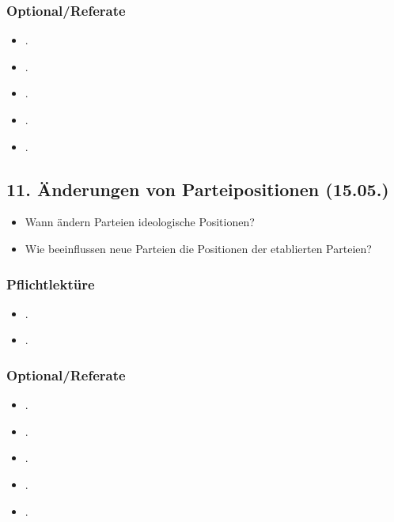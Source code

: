 \documentclass[abstract=on,parskip=full,headings=standardclasses,fontsize=11pt,paper=a4]{scrartcl}
\begin{document}
\subsubsection*{Optional/Referate}
\begin{itemize}
\item {}.
\item {}.
\item {}.
\item {}.
\item {}.
\end{itemize}


\subsection{11. Änderungen von Parteipositionen (15.05.)}

\begin{itemize}
\renewcommand\labelitemi{--}
\item Wann ändern Parteien ideologische Positionen?
\item Wie beeinflussen neue Parteien die Positionen der etablierten Parteien?
\end{itemize}


\subsubsection*{Pflichtlektüre}
\begin{itemize}
\item {}.
\item {}.
\end{itemize}



\subsubsection*{Optional/Referate}
\begin{itemize}
\item {}.
\item {}.
\item {}.
\item {}.
\item {}.
\end{itemize}
\end{document}
